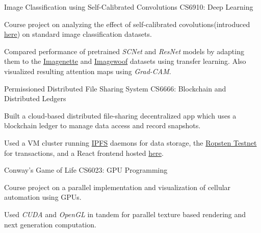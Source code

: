 \documentclass[10pt]{article}
\begin{document}
	\headedsectionthree
	{Image Classification using Self-Calibrated Convolutions}
	{}
	{CS6910: Deep Learning}
	{\vspace{-2.4ex}
		\begin{circlist}
			\item Course project on analyzing the effect of self-calibrated covolutions(introduced \href{http://mftp.mmcheng.net/Papers/20cvprSCNet.pdf}{here}) on standard image classification datasets.
			\item Compared performance of pretrained \textit{SCNet} and \textit{ResNet} models by adapting them to the \href{https://github.com/fastai/imagenette}{Imagenette} and \href{https://github.com/fastai/imagenette}{Imagewoof} datasets using transfer learning. Also visualized resulting attention maps using \textit{Grad-CAM}.
		\end{circlist}
	}

	\headedsectionthree
	{Permissioned Distributed File Sharing System}
	{}
	{CS6666: Blockchain and Distributed Ledgers}
	{\vspace{-2.4ex}
		\begin{circlist}
			\item Built a cloud-based distributed file-sharing decentralized app which uses a blockchain ledger to manage data access and record snapshots.
			\item Used a VM cluster running \href{https://ipfs.io/}{IPFS} daemons for data storage, the \href{https://ropsten.etherscan.io/}{Ropsten Testnet} for transactions, and a React frontend hosted \href{https://rough-truth-8164.on.fleek.co/}{here}.
		\end{circlist}
	}

	\headedsectionthree
	{Conway's Game of Life}
	{}
	{CS6023: GPU Programming}
	{\vspace{-2.4ex}
		\begin{circlist}
			\item Course project on a parallel implementation and visualization of cellular automation using GPUs.
			\item Used \textit{CUDA} and \textit{OpenGL} in tandem for parallel texture based rendering and next generation computation. 
		\end{circlist}
	}

	
\end{document}

